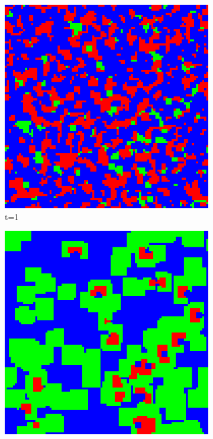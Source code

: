 \documentclass[a4paper, 11pt]{article}
\begin{document}
\begin{landscape}
\begin{figure}[H]
\begin{subfigure}{.20\textwidth}
  \includegraphics[width=0.95\linewidth]{ROCK_PAPER_SCISSORS_MOORE_100x100_HighRockPop50_t01}
  \caption{t=1}
\end{subfigure}%
\begin{subfigure}{.20\textwidth}
  \centering
  \includegraphics[width=0.95\linewidth]{ROCK_PAPER_SCISSORS_MOORE_100x100_HighRockPop50_t05}

\end{subfigure}
\end{figure}
\end{landscape}
\end{document}
